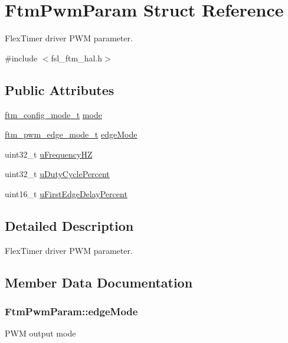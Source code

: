 \hypertarget{structFtmPwmParam}{}\section{Ftm\+Pwm\+Param Struct Reference}
\label{structFtmPwmParam}


Flex\+Timer driver P\+WM parameter.  




{\ttfamily \#include $<$fsl\+\_\+ftm\+\_\+hal.\+h$>$}

\subsection*{Public Attributes}
\begin{DoxyCompactItemize}
\item 
\hyperlink{group__ftm__hal_gac70fc66eaed6c7863ae8f9c632bac77a}{ftm\+\_\+config\+\_\+mode\+\_\+t} \hyperlink{structFtmPwmParam_a8ea0c02d8ce13209f06c98a707a5037f}{mode}
\item 
\hyperlink{group__ftm__hal_gad072678496c10bf3ebe1bba980a8ec7d}{ftm\+\_\+pwm\+\_\+edge\+\_\+mode\+\_\+t} \hyperlink{structFtmPwmParam_a311ef6071723d29f3427f8a7bc580691}{edge\+Mode}
\item 
uint32\+\_\+t \hyperlink{structFtmPwmParam_ad165194b75959ee61877a6169c6e895b}{u\+Frequency\+HZ}
\item 
uint32\+\_\+t \hyperlink{structFtmPwmParam_a0ce2cb93a84dade11458809e303716c3}{u\+Duty\+Cycle\+Percent}
\item 
uint16\+\_\+t \hyperlink{structFtmPwmParam_a67950ed56a49a0e41fdd7f9f5124ea9c}{u\+First\+Edge\+Delay\+Percent}
\end{DoxyCompactItemize}


\subsection{Detailed Description}
Flex\+Timer driver P\+WM parameter. 

\subsection{Member Data Documentation}
\subsubsection[{\texorpdfstring{edge\+Mode}{edgeMode}}]{ Ftm\+Pwm\+Param\+::edge\+Mode}\hypertarget{structFtmPwmParam_a311ef6071723d29f3427f8a7bc580691}{}\label{structFtmPwmParam_a311ef6071723d29f3427f8a7bc580691}
P\+WM output mode 
